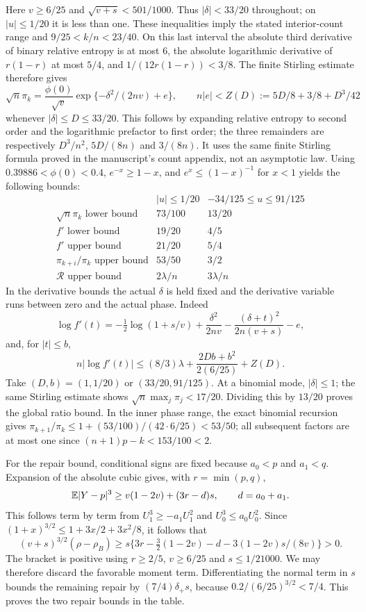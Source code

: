 Here $v\ge6/25$ and
$\sqrt{v+s}<501/1000$. Thus $|\delta|<33/20$ throughout;
on $|u|\le1/20$ it is less than one. These inequalities imply the stated
interior-count range and $9/25<k/n<23/40$.
On this last interval the absolute third derivative of binary relative
entropy is at most $6$, the absolute logarithmic derivative of $r(1-r)$
at most $5/4$, and $1/(12r(1-r))<3/8$. The finite Stirling estimate
therefore gives
\[
 \sqrt n\pi_k=\frac{\phi(0)}{\sqrt v}
       \exp\{-\delta^2/(2nv)+e\},\qquad
 n|e|<Z(D):=5D/8+3/8+D^3/42
\]
whenever $|\delta|\le D\le33/20$.
This follows by expanding relative entropy to second order and the
logarithmic prefactor to first order; the three remainders are respectively
$D^3/n^2$, $5D/(8n)$ and $3/(8n)$. It uses the same finite Stirling
formula proved in the manuscript's count appendix, not an asymptotic law.
Using $0.39886<\phi(0)<0.4$, $e^{-x}\ge1-x$, and
$e^x\le(1-x)^{-1}$ for $x<1$ yields the following bounds:
\[
\begin{array}{c|cc}
 & |u|\le1/20 & -34/125\le u\le91/125\\\hline
 \sqrt n\pi_k\text{ lower bound}&73/100&13/20\\
 f'\text{ lower bound}&19/20&4/5\\
 f'\text{ upper bound}&21/20&5/4\\
 \pi_{k+i}/\pi_k\text{ upper bound}&53/50&3/2\\
 \mathcal R\text{ upper bound}&2\lambda/n&3\lambda/n
\end{array}
\]
In the derivative bounds the actual $\delta$ is held fixed and the
derivative variable runs between zero and the actual phase. Indeed
\[
 \log f'(t)=-\tfrac12\log(1+s/v)+\frac{\delta^2}{2nv}
                  -\frac{(\delta+t)^2}{2n(v+s)}-e,
\]
and, for $|t|\le b$,
\[
 n|\log f'(t)|\le(8/3)\lambda+
       \frac{2Db+b^2}{2(6/25)}+Z(D).
\]
Take $(D,b)=(1,1/20)$ or $(33/20,91/125)$.
At a binomial mode, $|\delta|\le1$; the same Stirling estimate shows
$\sqrt n\max_j\pi_j<17/20$. Dividing this by $13/20$ proves the
global ratio bound. In the inner phase range, the exact binomial recursion
gives $\pi_{k+1}/\pi_k\le1+(53/100)/(42\cdot6/25)<53/50$;
all subsequent factors are at most one since $(n+1)p-k<153/100<2$.

For the repair bound, conditional signs are fixed because $a_0<p$ and
$a_1<q$. Expansion of the absolute cubic gives, with $r=\min(p,q)$,
\[
 \mathbb E|Y-p|^3\ge v(1-2v)+(3r-d)s,\qquad d=a_0+a_1.
\]
This follows term by term from
$U_1^3\ge-a_1U_1^2$ and $U_0^3\le a_0U_0^2$.
Since $(1+x)^{3/2}\le1+3x/2+3x^2/8$, it follows that
\[
 (v+s)^{3/2}(\rho-\rho_B)
 \ge s\{3r-\tfrac32(1-2v)-d-3(1-2v)s/(8v)\}>0.
\]
The bracket is positive using $r\ge2/5$, $v\ge6/25$ and
$s\le1/21000$. We may therefore discard the favorable moment term.
Differentiating the normal term in $s$ bounds the remaining repair by
$(7/4)\delta_+s$, because $0.2/(6/25)^{3/2}<7/4$. This proves the two
repair bounds in the table.

